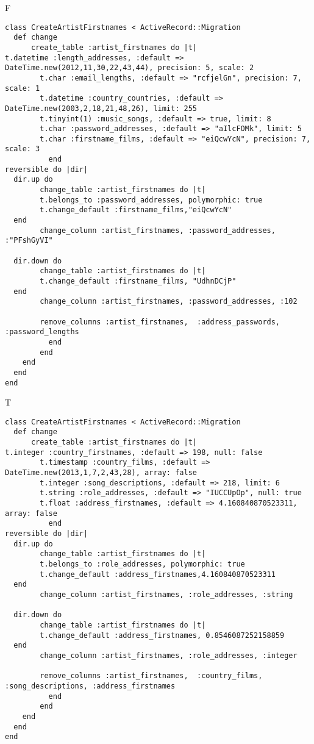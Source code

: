 F
\begin{verbatim}
class CreateArtistFirstnames < ActiveRecord::Migration
  def change
	  create_table :artist_firstnames do |t|
t.datetime :length_addresses, :default => DateTime.new(2012,11,30,22,43,44), precision: 5, scale: 2
		t.char :email_lengths, :default => "rcfjelGn", precision: 7, scale: 1
		t.datetime :country_countries, :default => DateTime.new(2003,2,18,21,48,26), limit: 255
		t.tinyint(1) :music_songs, :default => true, limit: 8
		t.char :password_addresses, :default => "aIlcFOMk", limit: 5
		t.char :firstname_films, :default => "eiQcwYcN", precision: 7, scale: 3
		  end
reversible do |dir|
  dir.up do
		change_table :artist_firstnames do |t|
		t.belongs_to :password_addresses, polymorphic: true
 		t.change_default :firstname_films,"eiQcwYcN"
  end
 		change_column :artist_firstnames, :password_addresses, :"PFshGyVI"
   
  dir.down do
		change_table :artist_firstnames do |t|
		t.change_default :firstname_films, "UdhnDCjP"
  end
 		change_column :artist_firstnames, :password_addresses, :102
   
		remove_columns :artist_firstnames,  :address_passwords, :password_lengths 
	      end
	    end
    end 
  end
end

\end{verbatim}

T
\begin{verbatim}
class CreateArtistFirstnames < ActiveRecord::Migration
  def change
	  create_table :artist_firstnames do |t|
t.integer :country_firstnames, :default => 198, null: false
		t.timestamp :country_films, :default => DateTime.new(2013,1,7,2,43,28), array: false
		t.integer :song_descriptions, :default => 218, limit: 6
		t.string :role_addresses, :default => "IUCCUpOp", null: true
		t.float :address_firstnames, :default => 4.160840870523311, array: false
		  end
reversible do |dir|
  dir.up do
		change_table :artist_firstnames do |t|
		t.belongs_to :role_addresses, polymorphic: true
 		t.change_default :address_firstnames,4.160840870523311
  end
 		change_column :artist_firstnames, :role_addresses, :string
   
  dir.down do
		change_table :artist_firstnames do |t|
		t.change_default :address_firstnames, 0.8546087252158859
  end
 		change_column :artist_firstnames, :role_addresses, :integer
   
		remove_columns :artist_firstnames,  :country_films, :song_descriptions, :address_firstnames 
	      end
	    end
    end 
  end
end

\end{verbatim}

